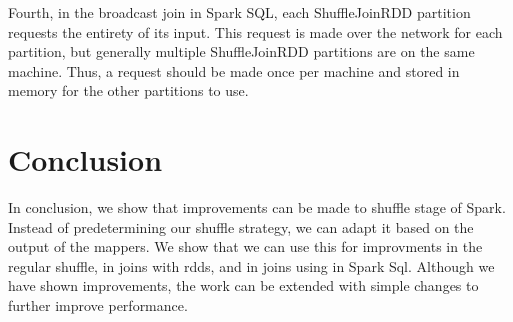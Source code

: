 Fourth, in the broadcast join in Spark SQL, each ShuffleJoinRDD partition requests the entirety of its input.
This request is made over the network for each partition, but generally  multiple ShuffleJoinRDD partitions are on the same machine.
Thus, a request should be made once per machine and stored in memory for the other partitions to use. 

\section {Conclusion}
In conclusion, we show that improvements can be made to shuffle stage of Spark.
Instead of predetermining our shuffle strategy, we can adapt it based on the output of the mappers.
We show that we can use this for improvments in the regular shuffle, in joins with rdds, and in 
joins using in Spark Sql. Although we have shown improvements, the work can be extended with simple changes
 to further improve performance. 


